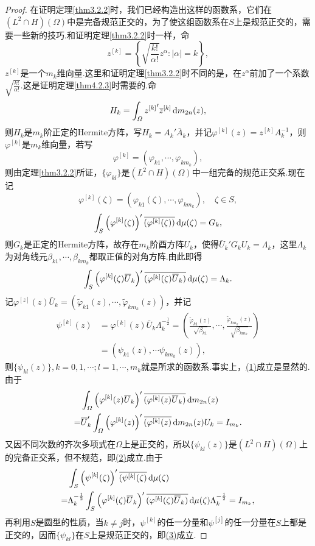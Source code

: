 \begin{proof}
	在证明定理\ref{thm3.2.2}时，我们已经构造出这样的函数系，它们在$(L^2\cap H)(\Omega)$中是完备规范正交的，为了使这组函数系在$S$上是规范正交的，需要一些新的技巧.和证明定理\ref{thm3.2.2}时一样，命
	\[z^{[k]}=\left\{\sqrt{\frac{k!}{\alpha!}}z^\alpha\colon|\alpha|=k\right\},\]
	$z^{[k]}$是一个$m_k$维向量.这里和证明定理\ref{thm3.2.2}时不同的是，在$z^\alpha$前加了一个系数$\sqrt{\frac{k!}{\alpha!}}$.这是证明定理\ref{thm4.2.3}时需要的.命
	\[H_k=\int_\varOmega{z^{[k]}}'{}\mkern1mu\overline{\mkern-1muz}^{[k]}\mathop{}\!\mathrm{d} m_{2n}(z),\]
	则$H_k$是$m_k$阶正定的Hermite方阵，写$H_k=A_k'\bar{A}_k$，并记$\varphi^{[k]}(z)=z^{[k]}A_k^{-1}$，则$\varphi^{[k]}$是$m_k$维向量，若写
	\[\varphi^{[k]}=(\varphi_{k1},\cdots,\varphi_{km_k}),\]
	则由定理\ref{thm3.2.2}所证，$\{\varphi_{kl}\}$是$(L^2\cap H)(\Omega)$中一组完备的规范正交系.现在记
	\[\varphi^{[k]}(\zeta)=(\varphi_{k1}(\zeta),\cdots,\varphi_{km_k}),\quad \zeta\in S,\]
	\[\int_S\left(\varphi^{[k]}(\zeta)\right)'{}\mkern1mu\overline{\mkern-1mu(\varphi^{[k]}(\zeta))}\mathop{}\!\mathrm{d}\mu(\zeta)=G_k,\]
	则$G_k$是正定的Hermite方阵，故存在$m_k$阶酉方阵$U_k$，使得$\bar{U}_k' G_k U_k=\Lambda_k$，这里$\Lambda_k$为对角线元$\beta_{k1},\cdots,\beta_{km_k}$都取正值的对角方阵.由此即得
	\[\int_S\left(\varphi^{[k]}(\zeta){}\mkern1mu\overline{\mkern-1muU}_k\right)'{}\mkern1mu\overline{\mkern-1mu(\varphi^{[k]}(\zeta){}\mkern1mu\overline{\mkern-1muU}_k)}\mathop{}\!\mathrm{d}\mu(\zeta)=\Lambda_k.\]
	记$\varphi^{[z]}(z)\bar{U}_k=(\tilde{\varphi}_{k1}(z),\cdots,\tilde{\varphi}_{km_k}(z))$，并记
	\begin{align*}
		\psi^{[k]}(z)
		&=\varphi^{[k]}(z)\bar{U}_k \Lambda_k^{-\frac12}=\left(\frac{\tilde{\varphi}_{k1}(z)}{\sqrt{\beta_{k1}}},\cdots,\frac{\tilde{\varphi}_{km_k}(z)}{\sqrt{\beta_{km_k}}}\right)\\
		&=(\psi_{k1}(z),\cdots\psi_{km_k}(z)),
	\end{align*}
则$\{\psi_{kl}(z)\},k=0,1,\cdots;l=1,\cdots,m_k$就是所求的函数系.事实上，\hyperlink{4.2.2}{(1)}成立是显然的.由于
\begin{align*}
	&\int_\varOmega\left(\varphi^{[k]}(z){}\mkern1mu\overline{\mkern-1muU}_k\right)'{}\mkern1mu\overline{\mkern-1mu(\varphi^{[k]}(z){}\mkern1mu\overline{\mkern-1muU}_k)}\mathop{}\!\mathrm{d} m_{2n}(z)\\
	=&{}\mkern1mu\overline{\mkern-1muU}_k' \int_\varOmega\left(\varphi^{[k]}(z)\right)'{}\mkern1mu\overline{\mkern-1mu(\varphi^{[k]}(z)}\mathop{}\!\mathrm{d} m_{2n}(z) U_k=I_{m_k}.
\end{align*}
又因不同次数的齐次多项式在$\Omega$上是正交的，所以$\{\psi_{kl}(z)\}$是$(L^2\cap H)(\Omega)$上的完备正交系，但不规范，即\hyperlink{4.2.2}{(2)}成立.由于
\begin{align*}
	&\int_S\left(\psi^{[k]}(\zeta)\right)'{}\mkern1mu\overline{\mkern-1mu(\psi^{[k]}(\zeta)}\mathop{}\!\mathrm{d}\mu(\zeta)\\
	=&\Lambda_k^{-\frac12}\int_S\left(\varphi^{[k]}(\zeta){}\mkern1mu\overline{\mkern-1muU}_k\right)'{}\mkern1mu\overline{\mkern-1mu(\varphi^{[k]}(\zeta){}\mkern1mu\overline{\mkern-1muU}_k)}\mathop{}\!\mathrm{d}\mu(\zeta)\Lambda_k^{-\frac12}=I_{m_k},
\end{align*}
再利用$S$是圆型的性质，当$k\neq j$时，$\psi^{[k]}$的任一分量和$\psi^{[j]}$的任一分量在$S$上都是正交的，因而$\{\psi_{kl}\}$在$S$上是规范正交的，即\hyperlink{4.2.2}{(3)}成立.
\end{proof}
